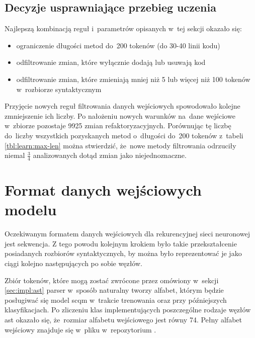 \documentclass[twoside]{praca}
\begin{document}
\subsection{Decyzje usprawniające przebieg uczenia}
\label{sec:learn:filter-best-result}

Najlepszą kombinacją reguł i~parametrów opisanych w~tej sekcji okazało się:

\begin{itemize}
\item ograniczenie długości metod do~200 tokenów (do 30-40 linii kodu)
\item odfiltrowanie zmian, które wyłącznie dodają lub usuwają kod
\item odfiltrowanie zmian, które zmieniają mniej niż 5 lub więcej niż 100 tokenów w~rozbiorze syntaktycznym
\end{itemize}






Przyjęcie nowych reguł filtrowania danych wejściowych spowodowało kolejne zmniejszenie ich liczby. Po nałożeniu nowych warunków na~dane wejściowe w~zbiorze pozostaje 9925 zmian refaktoryzacyjnych. Porównując tę liczbę do~liczby wszystkich pozyskanych metod o~długości do~200 tokenów z~tabeli \ref{tbl:learn:max-len} można stwierdzić, że~nowe metody filtrowania odrzuciły niemal $\frac34$ analizowanych dotąd zmian jako niejednoznaczne.



\section{Format danych wejściowych modelu}
\label{sec:impl:rnn-input}

Oczekiwanym formatem danych wejściowych dla rekurencyjnej sieci neuronowej jest sekwencja. Z tego powodu kolejnym krokiem było takie przekształcenie posiadanych rozbiorów syntaktycznych, by można było reprezentować je jako ciągi kolejno następujących po sobie węzłów.

Zbiór tokenów, które mogą zostać zwrócone przez omówiony w~sekcji \ref{sec:impl:ast} parser w~sposób naturalny tworzy alfabet, którym będzie posługiwać się model \gls{scqm} w~trakcie trenowania oraz przy późniejszych klasyfikacjach. Po zliczeniu klas implementujących poszczególne rodzaje węzłów \gls{ast} okazało się, że~rozmiar alfabetu wejściowego jest równy 74. Pełny alfabet wejściowy znajduje się w~pliku  w~repozytorium \cite{fracz:refactor-extractor}.
\end{document}
